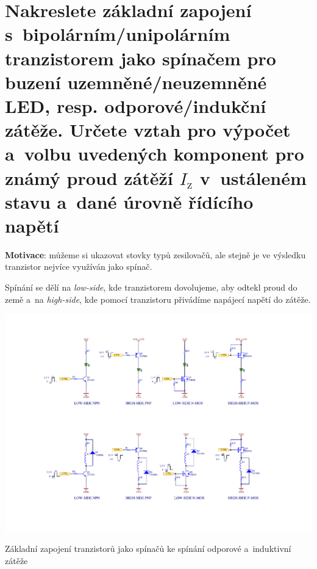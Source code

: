 \documentclass[a4paper,12pt]{article}   %
\begin{document}
\section{Nakreslete základní zapojení s~bipolárním/unipolárním tranzistorem jako spínačem pro buzení uzemněné/neuzemněné LED, resp. odporové/indukční zátěže. Určete vztah pro výpočet a~volbu uvedených komponent pro známý proud zátěží $I_\text{z}$ v~ustáleném stavu a~dané úrovně řídícího napětí}
\textbf{Motivace}: můžeme si ukazovat stovky typů zesilovačů, ale stejně je ve výsledku tranzistor nejvíce využíván jako spínač. 

Spínání se dělí na \textit{low-side}, kde tranzistorem dovolujeme, aby odtekl proud do země a~na \textit{high-side}, kde pomocí tranzistoru přivádíme napájecí napětí do zátěže.

\begin{schema}[h!]
    \centering
    \includegraphics[width=.9\textwidth]{tranzistory-spinace2_crop.pdf}
    \caption{Základní zapojení tranzistorů jako spínačů ke spínání odporové a~induktivní zátěže}
    \label{schema:transistory:spinace}
\end{schema}

\end{document}
